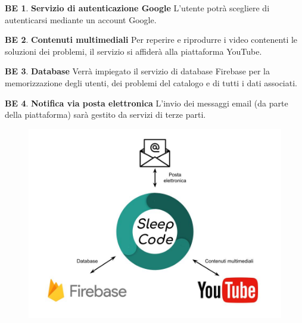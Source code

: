 \documentclass[11pt, a4paper]{article}
\theoremstyle{definition}
\newtheorem{backend}{BE}
\begin{document}
\begin{backend}
\textbf{Servizio di autenticazione Google }
L'utente potrà scegliere di autenticarsi mediante un account Google.
\end{backend}

\begin{backend}
\textbf{Contenuti multimediali }
Per reperire e riprodurre i video contenenti le soluzioni dei problemi,
il servizio si affiderà alla piattaforma YouTube.
\end{backend}

\begin{backend}
\textbf{Database }
Verrà impiegato il servizio di database Firebase per la memorizzazione
degli utenti, dei problemi del catalogo e di tutti i dati associati.
\end{backend}

\begin{backend}
\textbf{Notifica via posta elettronica }
L'invio dei messaggi email (da parte della piattaforma) sarà gestito da servizi di terze parti.
\end{backend}

\begin{figure}[H]
\centering
\includegraphics[scale=0.35]{materiale/backend.jpg}
\end{figure}
\end{document}

